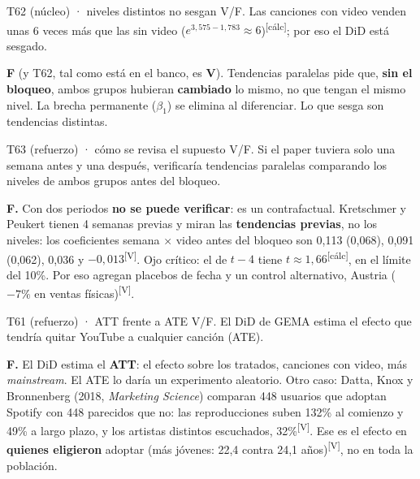 \documentclass[10pt,a4paper]{article}
\newcommand{\V}{\textsuperscript{\textcolor{green!45!black}{[V]}}}
\newcommand{\calc}{\textsuperscript{\textcolor{blue!60!black}{[cálc]}}}
\begin{document}
\begin{enun}{T62 (núcleo) · niveles distintos no sesgan}
V/F. Las canciones con video venden unas 6 veces más que las sin video ($e^{3,575-1,783}\approx6$)\calc; por eso el DiD está sesgado.
\end{enun}
\begin{ejemplar}
\textbf{F} (y T62, tal como está en el banco, es \textbf{V}). Tendencias paralelas pide que, \textbf{sin el bloqueo}, ambos grupos hubieran \textbf{cambiado} lo mismo, no que tengan el mismo nivel. La brecha permanente ($\beta_1$) se elimina al diferenciar. Lo que sesga son tendencias distintas.
\end{ejemplar}

\begin{enun}{T63 (refuerzo) · cómo se revisa el supuesto}
V/F. Si el paper tuviera solo una semana antes y una después, verificaría tendencias paralelas comparando los niveles de ambos grupos antes del bloqueo.
\end{enun}
\begin{ejemplar}
\textbf{F.} Con dos periodos \textbf{no se puede verificar}: es un contrafactual. Kretschmer y Peukert tienen 4 semanas previas y miran las \textbf{tendencias previas}, no los niveles: los coeficientes semana × video antes del bloqueo son 0,113 (0,068), 0,091 (0,062), 0,036 y $-0{,}013$\V. Ojo crítico: el de $t-4$ tiene $t\approx1{,}66$\calc, en el límite del 10\%. Por eso agregan placebos de fecha y un control alternativo, Austria ($-7\%$ en ventas físicas)\V.
\end{ejemplar}

\begin{enun}{T61 (refuerzo) · ATT frente a ATE}
V/F. El DiD de GEMA estima el efecto que tendría quitar YouTube a cualquier canción (ATE).
\end{enun}
\begin{ejemplar}
\textbf{F.} El DiD estima el \textbf{ATT}: el efecto sobre los tratados, canciones con video, más \emph{mainstream}. El ATE lo daría un experimento aleatorio. Otro caso: Datta, Knox y Bronnenberg (2018, \emph{Marketing Science}) comparan 448 usuarios que adoptan Spotify con 448 parecidos que no: las reproducciones suben 132\% al comienzo y 49\% a largo plazo, y los artistas distintos escuchados, 32\%\V. Ese es el efecto en \textbf{quienes eligieron} adoptar (más jóvenes: 22,4 contra 24,1 años)\V, no en toda la población.
\end{ejemplar}
\end{document}
